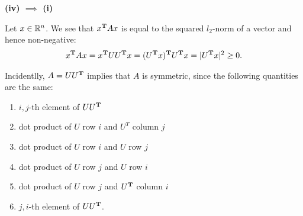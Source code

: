 \documentclass{article}
\begin{document}
\begin{enumerate}[label=(\alph*)]
\begin{mdframed}
      \textbf{(iv) $\implies$ (i)}

      Let $x \in \mathbb{R}^n$. We see that $x^{\mathbf{T}} Ax$ is equal to the squared
      $l_2$-norm of a vector and hence non-negative:
      \begin{align*}
        x^{\mathbf{T}} Ax = x^{\mathbf{T}} UU^{\mathbf{T}} x = (U^{\mathbf{T}} x)^{\mathbf{T}} U^{\mathbf{T}} x = |U^{\mathbf{T}} x|^2 \geq 0.
      \end{align*}

      Incidentlly, $A = UU^{\mathbf{T}}$ implies that $A$ is symmetric, since the
      following quantities are the same:
      \begin{enumerate}
      \item $i,j$-th element of $UU^{\mathbf{T}}$
      \item dot product of $U$ row $i$ and $U^T$ column $j$
      \item dot product of $U$ row $i$ and $U$ row $j$
      \item dot product of $U$ row $j$ and $U$ row $i$
      \item dot product of $U$ row $j$ and $U^{\mathbf{T}}$ column $i$
      \item $j,i$-th element of $UU^{\mathbf{T}}$.
      \end{enumerate}

    \end{mdframed}


\end{enumerate}
\end{document}
